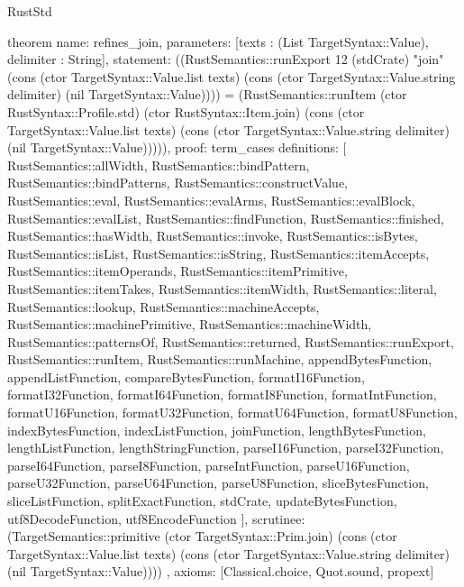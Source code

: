 \begin{lexlean}{RustStd}
\begin{semanticmodule}
theorem{
  name: refines_join,
  parameters: [texts : (List TargetSyntax::Value), delimiter : String],
  statement: ((RustSemantics::runExport 12 (stdCrate) "join" (cons (ctor TargetSyntax::Value.list texts) (cons (ctor TargetSyntax::Value.string delimiter) (nil TargetSyntax::Value)))) = (RustSemantics::runItem (ctor RustSyntax::Profile.std) (ctor RustSyntax::Item.join) (cons (ctor TargetSyntax::Value.list texts) (cons (ctor TargetSyntax::Value.string delimiter) (nil TargetSyntax::Value))))),
  proof: term_cases{
    definitions: [
      RustSemantics::allWidth,
      RustSemantics::bindPattern,
      RustSemantics::bindPatterns,
      RustSemantics::constructValue,
      RustSemantics::eval,
      RustSemantics::evalArms,
      RustSemantics::evalBlock,
      RustSemantics::evalList,
      RustSemantics::findFunction,
      RustSemantics::finished,
      RustSemantics::hasWidth,
      RustSemantics::invoke,
      RustSemantics::isBytes,
      RustSemantics::isList,
      RustSemantics::isString,
      RustSemantics::itemAccepts,
      RustSemantics::itemOperands,
      RustSemantics::itemPrimitive,
      RustSemantics::itemTakes,
      RustSemantics::itemWidth,
      RustSemantics::literal,
      RustSemantics::lookup,
      RustSemantics::machineAccepts,
      RustSemantics::machinePrimitive,
      RustSemantics::machineWidth,
      RustSemantics::patternsOf,
      RustSemantics::returned,
      RustSemantics::runExport,
      RustSemantics::runItem,
      RustSemantics::runMachine,
      appendBytesFunction,
      appendListFunction,
      compareBytesFunction,
      formatI16Function,
      formatI32Function,
      formatI64Function,
      formatI8Function,
      formatIntFunction,
      formatU16Function,
      formatU32Function,
      formatU64Function,
      formatU8Function,
      indexBytesFunction,
      indexListFunction,
      joinFunction,
      lengthBytesFunction,
      lengthListFunction,
      lengthStringFunction,
      parseI16Function,
      parseI32Function,
      parseI64Function,
      parseI8Function,
      parseIntFunction,
      parseU16Function,
      parseU32Function,
      parseU64Function,
      parseU8Function,
      sliceBytesFunction,
      sliceListFunction,
      splitExactFunction,
      stdCrate,
      updateBytesFunction,
      utf8DecodeFunction,
      utf8EncodeFunction
    ],
    scrutinee: (TargetSemantics::primitive (ctor TargetSyntax::Prim.join) (cons (ctor TargetSyntax::Value.list texts) (cons (ctor TargetSyntax::Value.string delimiter) (nil TargetSyntax::Value))))
  },
  axioms: [Classical.choice, Quot.sound, propext]
}


\end{semanticmodule}
\end{lexlean}
